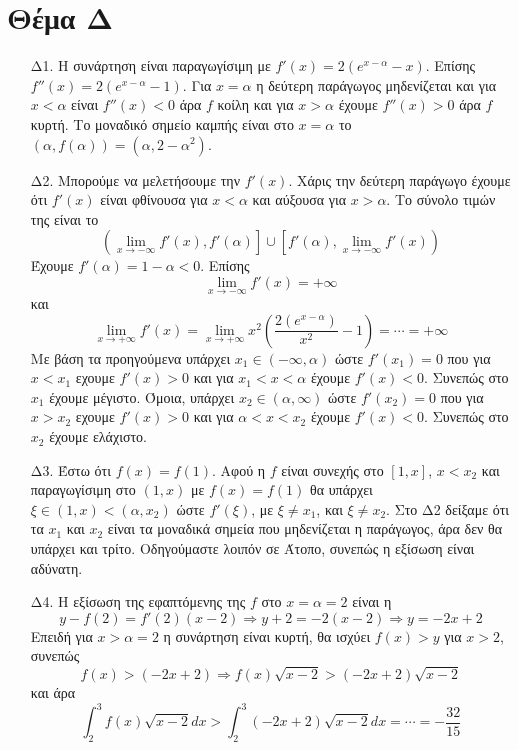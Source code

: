 \documentclass[12pt]{article}
\begin{document}
    \section*{Θέμα Δ}
      \begin{enumerate}
        \item [Δ1.] Η συνάρτηση είναι παραγωγίσιμη με $f'(x)=2(e^{x-α}-x)$. Επίσης $f''(x)=2(e^{x-α}-1)$. Για $x=α$ η δεύτερη παράγωγος μηδενίζεται και για $x<α$ είναι $f''(x)<0$ άρα $f$ κοίλη και για $x>α$ έχουμε $f''(x)>0$ άρα $f$ κυρτή. Το μοναδικό σημείο καμπής είναι στο $x=α$ το $(α,f(α))=(α,2-α^2)$.
        \item [Δ2.] Μπορούμε να μελετήσουμε την $f'(x)$. Χάρις την δεύτερη παράγωγο έχουμε ότι $f'(x)$ είναι φθίνουσα για $x<α$ και αύξουσα για $x>α$. Το σύνολο τιμών της είναι το
        $$ \left( \lim_{x\to -\infty}f'(x),f'(α) \right] \cup  \left[ f'(α), \lim_{x\to -\infty}f'(x) \right)$$
        Έχουμε $f'(α)=1-α<0$. Επίσης
        $$\lim_{x\to -\infty}f'(x)=+\infty$$
        και
        $$ \lim_{x\to +\infty}f'(x)=\lim_{x\to +\infty}x^2 \left( \frac{2(e^{x-α})}{x^2}-1 \right) = \cdots = +\infty$$
        Με βάση τα προηγούμενα υπάρχει $x_1\in (-\infty,α)$ ώστε $f'(x_1)=0$ που για $x<x_1$ εχουμε $f'(x)>0$ και για $x_1<x<α$ έχουμε $f'(x)<0$. Συνεπώς στο $x_1$ έχουμε μέγιστο. Όμοια, υπάρχει $x_2\in (α,\infty)$ ώστε $f'(x_2)=0$ που για $x>x_2$ εχουμε $f'(x)>0$ και για $α<x<x_2$ έχουμε $f'(x)<0$. Συνεπώς στο $x_2$ έχουμε ελάχιστο.
        \item [Δ3.] Έστω ότι $f(x)=f(1)$. Αφού η $f$ είναι συνεχής στο $[1,x]$, $x<x_2$ και παραγωγίσιμη στο $(1,x)$ με $f(x)=f(1)$ θα υπάρχει $ξ\in (1,x)< (α,x_2)$ ώστε $f'(ξ)$, με $ξ\ne x_1$, και $ξ\ne x_2$. Στο Δ2 δείξαμε ότι τα $x_1$ και $x_2$ είναι τα μοναδικά σημεία που μηδενίζεται η παράγωγος, άρα δεν θα υπάρχει και τρίτο. Οδηγούμαστε λοιπόν σε Άτοπο, συνεπώς η εξίσωση είναι αδύνατη.
        \item [Δ4.] Η εξίσωση της εφαπτόμενης της $f$ στο $x=α=2$ είναι η
        $$y-f(2)=f'(2)(x-2) \Rightarrow y+2=-2(x-2) \Rightarrow y=-2x+2$$
        Επειδή για $x>α=2$ η συνάρτηση είναι κυρτή, θα ισχύει $f(x)>y$ για $x>2$, συνεπώς
        $$f(x)>(-2x+2) \Rightarrow f(x)\sqrt{x-2} > (-2x+2)\sqrt{x-2}$$
        και άρα
        $$\int_2^3f(x)\sqrt{x-2}dx > \int_2^3 (-2x+2)\sqrt{x-2}dx = \cdots = -\frac{32}{15}$$
      \end{enumerate}
\end{document}
